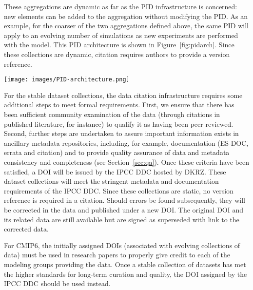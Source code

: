 \documentclass[gmd,manuscript]{copernicus}
\newcommand{\pllabel}[1]{\label{p-#1}\linelabel{l-#1}}
\begin{document}
These aggregations are dynamic as far as the PID infrastructure is
concerned: new elements can be added to the aggregation without
modifying the PID. As an example, for the coarser of the two
aggregations defined above, the same PID will apply to an evolving
number of simulations as new experiments are performed with the model.
This PID architecture is shown in Figure~\ref{fig:pidarch}. Since these
collections are dynamic, citation requires authors to provide a
version reference.

\begin{figure*}
  \begin{center}
    \texttt{[image: images/PID-architecture.png]}
  \end{center}
  \caption{Schematic PID architecture, showing layers in the PID
    hierarchy. In the lower layers of the hierarchy, PIDs are static
    once generated, and new datasets generate new versions with new
    PIDs. Each file carries a PID and each collection (dataset,
    simulation, ..) is related to a PID. Resolving the PID in the
    Handle server guides the user to the file or the landing page
    describing the collection. Each box in the figure will be
    addressed uniquely by its PID.}
  \label{fig:pidarch}
\end{figure*}

For the stable dataset collections, the data citation infrastructure
requires some additional steps to meet formal requirements. First, we
ensure that there has been sufficient community examination of the
data
\pllabel{RC1-40}
(through citations in published literature, for instance) to qualify
it as having been peer-reviewed. Second, further steps are undertaken
to assure important information exists in ancillary metadata
repositories, including, for example, documentation (ES-DOC, errata
and citation) and to provide quality assurance of data and metadata
consistency and completeness (see Section~\ref{sec:qa}). Once these
criteria have been satisfied, a DOI will be issued by the IPCC DDC
hosted by DKRZ. These dataset collections will meet the stringent
metadata and documentation requirements of the IPCC DDC. Since these
collections are static, no version reference is required in a
citation.
\pllabel{RC1-41}
Should errors be found subsequently, they will be corrected in the
data and published under a new DOI. The original DOI and its related
data are still available but are signed as superseded with link to the
corrected data.

For CMIP6, the initially assigned DOIs (associated with evolving
collections of data) must be used in research papers to properly give
credit to each of the modeling groups providing the data. Once a
stable collection of datasets has met the higher standards for
long-term curation and quality, the DOI assigned by the IPCC DDC
should be used instead.
\end{document}
